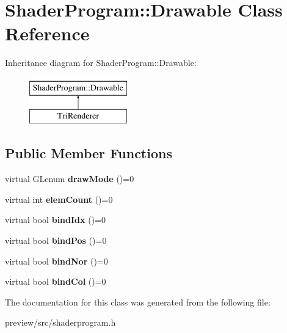 \hypertarget{class_shader_program_1_1_drawable}{}\section{Shader\+Program\+:\+:Drawable Class Reference}
\label{class_shader_program_1_1_drawable}
Inheritance diagram for Shader\+Program\+:\+:Drawable\+:\begin{figure}[H]
\begin{center}
\leavevmode
\includegraphics[height=2.000000cm]{class_shader_program_1_1_drawable}
\end{center}
\end{figure}
\subsection*{Public Member Functions}
\begin{DoxyCompactItemize}
\item 
\hypertarget{class_shader_program_1_1_drawable_a332f13c158eea7a688bb82bc38f15c31}{}virtual G\+Lenum {\bfseries draw\+Mode} ()=0\label{class_shader_program_1_1_drawable_a332f13c158eea7a688bb82bc38f15c31}

\item 
\hypertarget{class_shader_program_1_1_drawable_a77ce0c8678c3cf64f3f195e19defb9b6}{}virtual int {\bfseries elem\+Count} ()=0\label{class_shader_program_1_1_drawable_a77ce0c8678c3cf64f3f195e19defb9b6}

\item 
\hypertarget{class_shader_program_1_1_drawable_ac00e86a861a6f0cd4d9f9dd46f77b8e8}{}virtual bool {\bfseries bind\+Idx} ()=0\label{class_shader_program_1_1_drawable_ac00e86a861a6f0cd4d9f9dd46f77b8e8}

\item 
\hypertarget{class_shader_program_1_1_drawable_a16dc86183452514f1597c44fa167f5c6}{}virtual bool {\bfseries bind\+Pos} ()=0\label{class_shader_program_1_1_drawable_a16dc86183452514f1597c44fa167f5c6}

\item 
\hypertarget{class_shader_program_1_1_drawable_aeb05b0e075afe2010bbddfdb3b816f9d}{}virtual bool {\bfseries bind\+Nor} ()=0\label{class_shader_program_1_1_drawable_aeb05b0e075afe2010bbddfdb3b816f9d}

\item 
\hypertarget{class_shader_program_1_1_drawable_a20833f26156ede30f060dee76fbf0c39}{}virtual bool {\bfseries bind\+Col} ()=0\label{class_shader_program_1_1_drawable_a20833f26156ede30f060dee76fbf0c39}

\end{DoxyCompactItemize}


The documentation for this class was generated from the following file\+:\begin{DoxyCompactItemize}
\item 
preview/src/shaderprogram.\+h\end{DoxyCompactItemize}

